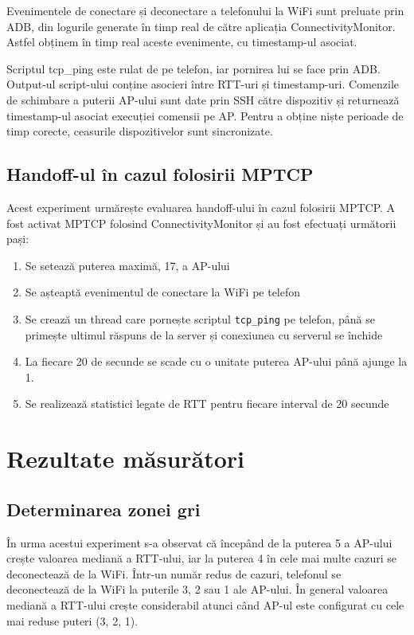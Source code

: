 Evenimentele de conectare și deconectare a telefonului la WiFi sunt preluate prin ADB, din logurile generate în timp real de către aplicația ConnectivityMonitor. Astfel obținem în timp real aceste evenimente, cu timestamp-ul asociat.

Scriptul tcp\_ping este rulat de pe telefon, iar pornirea lui se face prin ADB. Output-ul script-ului conține asocieri între RTT-uri și timestamp-uri. Comenzile de schimbare a puterii AP-ului sunt date prin SSH către dispozitiv și returnează timestamp-ul asociat execuției comensii pe AP. Pentru a obține niște perioade de timp corecte, ceasurile dispozitivelor sunt sincronizate.

\subsection{Handoff-ul în cazul folosirii MPTCP}

Acest experiment urmărește evaluarea handoff-ului în cazul folosirii MPTCP. A fost activat MPTCP folosind ConnectivityMonitor și au fost efectuați următorii pași:
\begin{enumerate}
	\item Se setează puterea maximă, 17,  a AP-ului
	\item Se așteaptă evenimentul de conectare la WiFi pe telefon
	\item Se crează un thread care pornește scriptul \texttt{tcp\_ping} pe telefon, până se primește ultimul răspuns de la server și conexiunea cu serverul se închide
	\item La fiecare 20 de secunde se scade cu o unitate puterea AP-ului până ajunge la 1.
	\item Se realizează statistici legate de RTT pentru fiecare interval de 20 secunde
\end{enumerate}

\section{Rezultate măsurători}

\subsection{Determinarea zonei gri}

În urma acestui experiment s-a observat că începând de la puterea 5 a AP-ului crește valoarea mediană a RTT-ului, iar la puterea 4 în cele mai multe cazuri se deconectează de la WiFi. Într-un număr redus de cazuri, telefonul se deconectează de la WiFi la puterile 3, 2 sau 1 ale AP-ului. În general valoarea mediană a RTT-ului crește considerabil atunci când AP-ul este configurat cu cele mai reduse puteri (3, 2, 1).

